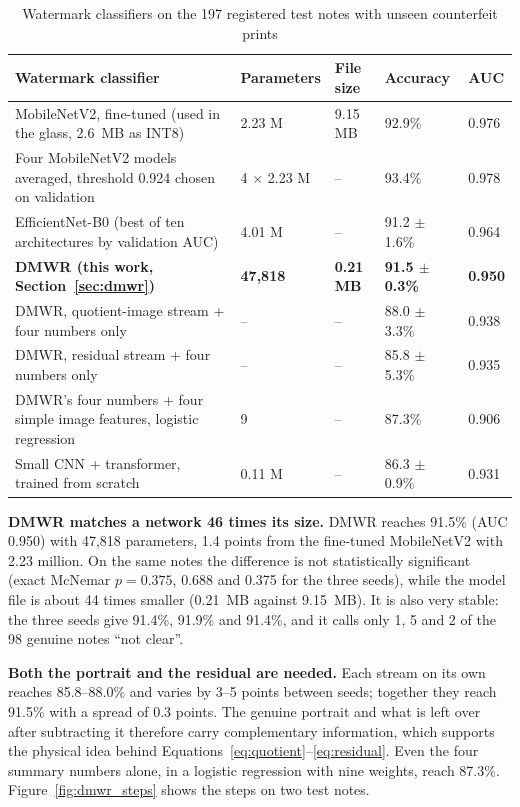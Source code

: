 \begin{table}[!htbp]
\centering
\caption{Watermark classifiers on the 197 registered test notes with unseen counterfeit prints}
\label{tab:wm_models}
\small
\begin{tabular}{|L{5.8cm}|C{2.0cm}|C{1.7cm}|C{2.2cm}|C{1.5cm}|}
\hline
\textbf{Watermark classifier} & \textbf{Parameters} & \textbf{File size} & \textbf{Accuracy} & \textbf{AUC} \\ \hline
MobileNetV2, fine-tuned (used in the glass, 2.6~MB as INT8) & 2.23 M & 9.15 MB & 92.9\% & 0.976 \\ \hline
Four MobileNetV2 models averaged, threshold 0.924 chosen on validation & 4 $\times$ 2.23 M & -- & 93.4\% & 0.978 \\ \hline
EfficientNet-B0 (best of ten architectures by validation AUC) & 4.01 M & -- & 91.2 $\pm$ 1.6\% & 0.964 \\ \hline
\textbf{DMWR (this work, Section~\ref{sec:dmwr})} & \textbf{47,818} & \textbf{0.21 MB} & \textbf{91.5 $\pm$ 0.3\%} & \textbf{0.950} \\ \hline
DMWR, quotient-image stream + four numbers only & -- & -- & 88.0 $\pm$ 3.3\% & 0.938 \\ \hline
DMWR, residual stream + four numbers only & -- & -- & 85.8 $\pm$ 5.3\% & 0.935 \\ \hline
DMWR's four numbers + four simple image features, logistic regression & 9 & -- & 87.3\% & 0.906 \\ \hline
Small CNN + transformer, trained from scratch & 0.11 M & -- & 86.3 $\pm$ 0.9\% & 0.931 \\ \hline
\end{tabular}
\end{table}

\textbf{DMWR matches a network 46 times its size.} DMWR reaches 91.5\% (AUC 0.950) with 47,818 parameters, 1.4 points from the fine-tuned MobileNetV2 with 2.23 million. On the same notes the difference is not statistically significant (exact McNemar $p = 0.375$, 0.688 and 0.375 for the three seeds), while the model file is about 44 times smaller (0.21~MB against 9.15~MB). It is also very stable: the three seeds give 91.4\%, 91.9\% and 91.4\%, and it calls only 1, 5 and 2 of the 98 genuine notes ``not clear''.

\textbf{Both the portrait and the residual are needed.} Each stream on its own reaches 85.8--88.0\% and varies by 3--5 points between seeds; together they reach 91.5\% with a spread of 0.3 points. The genuine portrait and what is left over after subtracting it therefore carry complementary information, which supports the physical idea behind Equations~\eqref{eq:quotient}--\eqref{eq:residual}. Even the four summary numbers alone, in a logistic regression with nine weights, reach 87.3\%. Figure~\ref{fig:dmwr_steps} shows the steps on two test notes.

